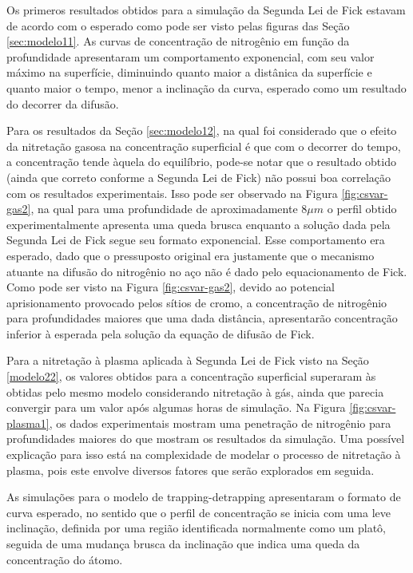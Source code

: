 Os primeros resultados obtidos para a simulação da Segunda Lei de Fick estavam de acordo com o esperado como pode ser visto pelas figuras das Seção \ref{sec:modelo11}. As curvas de concentração de nitrogênio em função da profundidade apresentaram um comportamento exponencial, com seu valor máximo na superfície, diminuindo quanto maior a distânica da superfície e quanto maior o tempo, menor a inclinação da curva, esperado como um resultado do decorrer da difusão.

Para os resultados da Seção \ref{sec:modelo12}, na qual foi considerado que o efeito da nitretação gasosa na concentração superficial é que com o decorrer do tempo, a concentração tende àquela do equilíbrio, pode-se notar que o resultado obtido (ainda que correto conforme a Segunda Lei de Fick) não possui boa correlação com os resultados experimentais. Isso pode ser observado na Figura \ref{fig:csvar-gas2}, na qual para uma profundidade de aproximadamente 8$\mu m$ o perfil obtido experimentalmente apresenta uma queda brusca enquanto a solução dada pela Segunda Lei de Fick segue seu formato exponencial. Esse comportamento era esperado, dado que o pressuposto original era justamente que o mecanismo atuante na difusão do nitrogênio no aço não é dado pelo equacionamento de Fick. Como pode ser visto na Figura \ref{fig:csvar-gas2}, devido ao potencial aprisionamento provocado pelos sítios de cromo, a concentração de nitrogênio para profundidades maiores que uma dada distância, apresentarão concentração inferior à esperada pela solução da equação de difusão de Fick.

Para a nitretação à plasma aplicada à Segunda Lei de Fick visto na Seção \ref{modelo22}, os valores obtidos para a concentração superficial superaram às obtidas pelo mesmo modelo considerando nitretação à gás, ainda que parecia convergir para um valor após algumas horas de simulação. Na Figura \ref{fig:csvar-plasma1}, os dados experimentais mostram uma penetração de nitrogênio para profundidades maiores do que mostram os resultados da simulação. Uma possível explicação para isso está na complexidade de modelar o processo de nitretação à plasma, pois este envolve diversos fatores que serão  explorados em seguida.


As simulações para o modelo de trapping-detrapping apresentaram o formato de curva esperado, no sentido que o perfil de concentração se inicia com uma leve inclinação, definida por uma região identificada normalmente como um platô, seguida de uma mudança brusca da inclinação que indica uma queda da concentração do átomo.

